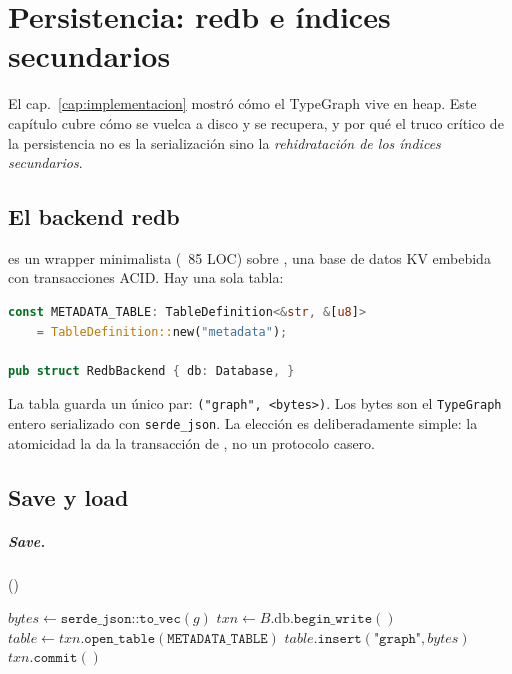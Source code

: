 \chapter{Persistencia: redb e índices secundarios}
\label{cap:persistencia}

El cap.~\ref{cap:implementacion} mostró cómo el TypeGraph vive en
heap. Este capítulo cubre cómo se vuelca a disco y se recupera, y por
qué el truco crítico de la persistencia no es la serialización sino la
\emph{rehidratación de los índices secundarios}.

\section{El backend redb}

 es un wrapper minimalista (~85 LOC) sobre
\redb{}, una base de datos KV embebida con transacciones ACID. Hay una
sola tabla:

\begin{lstlisting}[language=rust]
const METADATA_TABLE: TableDefinition<&str, &[u8]>
    = TableDefinition::new("metadata");

pub struct RedbBackend { db: Database, }
\end{lstlisting}

La tabla guarda un único par: \texttt{("graph", <bytes>)}. Los bytes
son el \texttt{TypeGraph} entero serializado con \texttt{serde\_json}.
La elección es deliberadamente simple: la atomicidad la da la
transacción de \redb, no un protocolo casero.

\section{Save y load}

\paragraph{Save.} ()

\begin{algorithm}[H]
\SetAlgoLined
{}
\caption{\textsc{Backend.Save}}\label{alg:save}

$\textit{bytes} \gets \texttt{serde\_json::to\_vec}(g)$\;
$\textit{txn} \gets B.\textrm{db}.\texttt{begin\_write}()$\;
$\textit{table} \gets \textit{txn}.\texttt{open\_table}(\texttt{METADATA\_TABLE})$\;
$\textit{table}.\texttt{insert}(\texttt{"graph"}, \textit{bytes})$\;
$\textit{txn}.\texttt{commit}()$
\end{algorithm}

